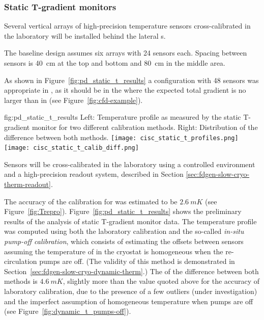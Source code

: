 
\subsubsection{Static T-gradient monitors}
\label{sec:fdgen-slow-cryo-static-therm}

Several vertical arrays of high-precision temperature sensors cross-calibrated in the laboratory will be installed behind the lateral s.  

The baseline design assumes six arrays with \num{24} sensors each. 
Spacing between sensors
is \SI{40}{cm} at the top and bottom and \SI{80}{cm} in the middle area.

As shown in Figure~\ref{fig:pd_static_t_results} a configuration with \num{48} sensors was appropriate in , as it should be in the  where the expected total gradient is no larger than in  (see Figure~\ref{fig:cfd-example}). 

\begin{dunefigure}{fig:pd_static_t_results}{
 Left: Temperature profile as measured by the static T-gradient monitor for two different calibration methods. Right: Distribution of the difference between both methods.}
  \texttt{[image: cisc\_static\_t\_profiles.png]}%
  \texttt{[image: cisc\_static\_t\_calib\_diff.png]}%
\end{dunefigure}



Sensors will be cross-calibrated in the laboratory using a controlled environment and a high-precision readout system, described in Section \ref{sec:fdgen-slow-cryo-therm-readout}.

The accuracy of the calibration for  was estimated to be $\SI{2.6}{mK}$ (see Figure~\ref{fig:Trepro}). Figure~\ref{fig:pd_static_t_results} shows the preliminary results of the analysis of  static T-gradient monitor data. The temperature profile was computed using both the laboratory calibration and the so-called \textit{in-situ pump-off calibration}, which consists %
of estimating the offsets between sensors assuming the temperature of \lar in the cryostat is homogeneous when the re-circulation pumps are off. (The validity of this method is demonstrated in Section~\ref{sec:fdgen-slow-cryo-dynamic-therm}.)  
The  of the difference between both methods is $\SI{4.6}{mK}$, slightly more than the value quoted above for the accuracy of laboratory calibration, due to the presence of a few outliers (under investigation) and the imperfect assumption of homogeneous temperature when pumps are off (see Figure~\ref{fig:dynamic_t_pumps-off}).  

